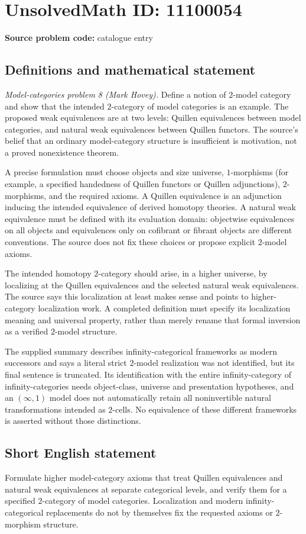 \documentclass[11pt]{article}
\begin{document}
\section*{UnsolvedMath ID: 11100054}
\textbf{Source problem code:} catalogue entry
\subsection{Definitions and mathematical statement}
\emph{Model-categories problem 8 (Mark Hovey).} Define a notion of \(2\)-model category and show that the intended \(2\)-category of model categories is an example. The proposed weak equivalences are at two levels: Quillen equivalences between model categories, and natural weak equivalences between Quillen functors. The source's belief that an ordinary model-category structure is insufficient is motivation, not a proved nonexistence theorem.

A precise formulation must choose objects and size universe, \(1\)-morphisms (for example, a specified handedness of Quillen functors or Quillen adjunctions), \(2\)-morphisms, and the required axioms. A Quillen equivalence is an adjunction inducing the intended equivalence of derived homotopy theories. A natural weak equivalence must be defined with its evaluation domain: objectwise equivalences on all objects and equivalences only on cofibrant or fibrant objects are different conventions. The source does not fix these choices or propose explicit \(2\)-model axioms.

The intended homotopy \(2\)-category should arise, in a higher universe, by localizing at the Quillen equivalences and the selected natural weak equivalences. The source says this localization at least makes sense and points to higher-category localization work. A completed definition must specify its localization meaning and universal property, rather than merely rename that formal inversion as a verified \(2\)-model structure.

The supplied summary describes infinity-categorical frameworks as modern successors and says a literal strict \(2\)-model realization was not identified, but its final sentence is truncated. Its identification with the entire infinity-category of infinity-categories needs object-class, universe and presentation hypotheses, and an \((\infty,1)\) model does not automatically retain all noninvertible natural transformations intended as \(2\)-cells. No equivalence of these different frameworks is asserted without those distinctions.
\subsection{Short English statement}
Formulate higher model-category axioms that treat Quillen equivalences and natural weak equivalences at separate categorical levels, and verify them for a specified \(2\)-category of model categories. Localization and modern infinity-categorical replacements do not by themselves fix the requested axioms or \(2\)-morphism structure.
\end{document}
